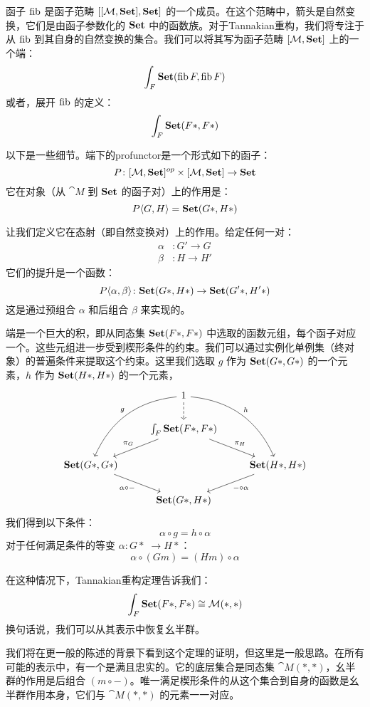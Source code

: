 \documentclass[DaoFP]{subfiles}
\begin{document}
函子 $\mathop{\text{fib}}$ 是函子范畴 $[[\mathcal{M}, \mathbf{Set}], \mathbf{Set}]$ 的一个成员。在这个范畴中，箭头是自然变换，它们是由函子参数化的 $\mathbf{Set}$ 中的函数族。对于Tannakian重构，我们将专注于从 $\mathop{\text{fib}}$ 到其自身的自然变换的集合。我们可以将其写为函子范畴 $[\mathcal{M}, \mathbf{Set}]$ 上的一个端：
\[ \int_F \mathbf{Set}(\mathop{\text{fib}} F, \mathop{\text{fib}} F) \]
或者，展开 $\mathop{\text{fib}}$ 的定义：
\[ \int_F \mathbf{Set}(F *, F *) \]

以下是一些细节。端下的profunctor是一个形式如下的函子：
\[ P \colon [\mathcal{M}, \mathbf{Set}]^{op} \times [\mathcal{M}, \mathbf{Set}] \to \mathbf{Set} \]
它在对象（从 $\cat M$ 到 $\mathbf{Set}$ 的函子对）上的作用是：
\[ P \langle G, H \rangle = \mathbf{Set} (G *, H *) \]

让我们定义它在态射（即自然变换对）上的作用。给定任何一对：
\begin{align*}
\alpha &\colon G' \to G \\ 
\beta &\colon H \to H'
\end{align*}
它们的提升是一个函数：
\[ P\langle \alpha, \beta \rangle \colon  \mathbf{Set} ( G*, H*)  \to \mathbf{Set} (G'*, H'*)\] 这是通过预组合 $\alpha$ 和后组合 $\beta$ 来实现的。

端是一个巨大的积，即从同态集 $\mathbf{Set} ( F*, F*)$ 中选取的函数元组，每个函子对应一个。这些元组进一步受到楔形条件的约束。我们可以通过实例化单例集（终对象）的普遍条件来提取这个约束。这里我们选取 $g$ 作为 $\mathbf{Set} (G*, G*)$ 的一个元素，$h$ 作为 $\mathbf{Set} (H*, H*)$ 的一个元素，
\[
 \begin{tikzcd}
 & 1
 \arrow[ddl, bend right,  "g"']
 \arrow[ddr, bend left, "h"]
 \arrow[d, dashed, ""]
 \\
 & \int_F \Set (F *, F *)
 \arrow[dl, "\pi_G"']
 \arrow[dr, "\pi_H"]
 \\
 \Set(G *, G *)
 \arrow[dr, "\alpha \circ -"']
 && \Set (H *, H *)
  \arrow[dl, "- \circ \alpha"]
\\
 & \Set (G *, H *)
 \end{tikzcd}
\]
我们得到以下条件：
\[  \alpha \circ g = h \circ \alpha  \]
对于任何满足条件的等变 $\alpha \colon G *\; \to H *$：
\[ \alpha \circ (G m) = (H m) \circ \alpha \]

在这种情况下，Tannakian重构定理告诉我们：
\[ \int_F \mathbf{Set}(F *, F *) \cong \mathcal{M} (*, *) \]
换句话说，我们可以从其表示中恢复幺半群。

我们将在更一般的陈述的背景下看到这个定理的证明，但这里是一般思路。在所有可能的表示中，有一个是满且忠实的。它的底层集合是同态集 $\cat M (*, *)$，幺半群的作用是后组合 $(m \circ -)$。唯一满足楔形条件的从这个集合到自身的函数是幺半群作用本身，它们与 $\cat M (*, *)$ 的元素一一对应。
\end{document}
